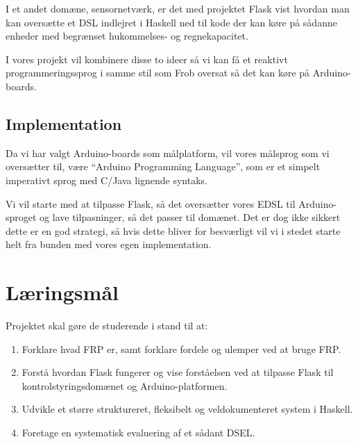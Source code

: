 \documentclass[a4paper,oneside, draft]{memoir}
\begin{document}
I et andet domæne, sensornetværk, er det med projektet Flask\cite{flask08} vist
hvordan man kan oversætte et DSL indlejret i Haskell ned til kode der
kan køre på sådanne enheder med begrænset hukommelses- og
regnekapacitet.

I vores projekt vil kombinere disse to ideer så vi kan få et reaktivt
programmeringssprog i samme stil som Frob oversat så det kan køre på
Arduino-boards.


\subsection{Implementation}
Da vi har valgt Arduino-boards som målplatform, vil vores målsprog
som vi oversætter til, være "`Arduino Programming Language"', som er et
simpelt imperativt sprog med C/Java lignende syntaks.

Vi vil starte med at tilpasse Flask, så det oversætter vores EDSL til
Arduino-sproget og lave tilpasninger, så det passer til domænet. Det
er dog ikke sikkert dette er en god strategi, så hvis dette bliver for
besværligt vil vi i stedet starte helt fra bunden med vores egen
implementation.

\section{Læringsmål}

Projektet skal gøre de studerende i stand til at:

\begin{enumerate}
\item Forklare hvad FRP er, samt forklare fordele og ulemper ved at bruge FRP.

\item Forstå hvordan Flask fungerer og vise forståelsen ved at
  tilpasse Flask til kontrolstyringsdomænet og Arduino-platformen.

\item Udvikle et større struktureret, fleksibelt og veldokumenteret system i Haskell.

\item Foretage en systematisk evaluering af et sådant DSEL. 
\end{enumerate}
\end{document}
